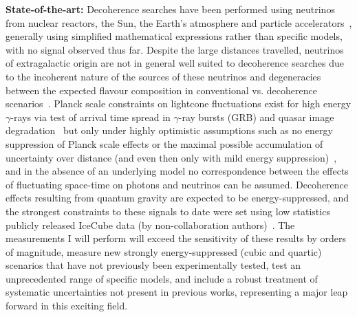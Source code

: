 \documentclass[a4paper,11pt]{article}
\begin{document}
\textbf{State-of-the-art:} Decoherence searches have been performed using neutrinos from nuclear reactors, the Sun, the Earth's atmosphere and particle accelerators~\cite{PhysRevLett.85.1166, Abbasi:2009nfa, PhysRevD.89.053002, Bakhti:2015dca, Coelho:2017zes, PhysRevD.95.113005, Coloma:2018idr, de_Holanda_2020}, generally using simplified mathematical expressions rather than specific models, with no signal observed thus far. Despite the large distances travelled, neutrinos of extragalactic origin are not in general well suited to decoherence searches due to the incoherent nature of the sources of these neutrinos and degeneracies between the expected flavour composition in conventional vs. decoherence scenarios~\cite{PhysRevD.102.115003}. Planck scale constraints on lightcone fluctuations exist for high energy $\gamma$-rays via test of arrival time spread in $\gamma$-ray bursts (GRB) and quasar image degradation~\cite{Vasileiou2015, Perlman_2015} but only under highly optimistic assumptions such as no energy suppression of Planck scale effects or the maximal possible accumulation of uncertainty over distance (and even then only with mild energy suppression)~\cite{2103.15313}, and in the absence of an underlying model no correspondence between the effects of fluctuating space-time on photons and neutrinos can be assumed. Decoherence effects resulting from quantum gravity are expected to be energy-suppressed, and the strongest constraints to these signals to date were set using low statistics publicly released IceCube data (by non-collaboration authors)~\cite{Coloma:2018idr}. The measurements I will perform will exceed the sensitivity of these results by orders of magnitude, measure new strongly energy-suppressed (cubic and quartic) scenarios that have not previously been experimentally tested, test an unprecedented range of specific models, and include a robust treatment of systematic uncertainties not present in previous works, representing a major leap forward in this exciting field. \\




\end{document}

